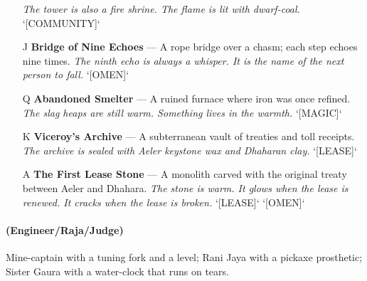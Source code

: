 \begin{enumerate}
  \hfill \textit{The tower is also a fire shrine. The flame is lit with dwarf-coal.} `[COMMUNITY]`
\item[J] \textbf{Bridge of Nine Echoes} --- A rope bridge over a chasm; each step echoes nine times.
  \hfill \textit{The ninth echo is always a whisper. It is the name of the next person to fall.} `[OMEN]`
\item[Q] \textbf{Abandoned Smelter} --- A ruined furnace where iron was once refined.
  \hfill \textit{The slag heaps are still warm. Something lives in the warmth.} `[MAGIC]`
\item[K] \textbf{Viceroy's Archive} --- A subterranean vault of treaties and toll receipts.
  \hfill \textit{The archive is sealed with Aeler keystone wax and Dhaharan clay.} `[LEASE]`
\item[A] \textbf{The First Lease Stone} --- A monolith carved with the original treaty between Aeler and Dhahara.
  \hfill \textit{The stone is warm. It glows when the lease is renewed. It cracks when the lease is broken.} `[LEASE]` `[OMEN]`
\end{enumerate}

\paragraph*{(Engineer/Raja/Judge)} Mine-captain with a tuning fork and a level; Rani Jaya with a pickaxe prosthetic; Sister Gaura with a water-clock that runs on tears.

